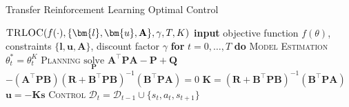 \begin{algorithm}[H]
\caption{Transfer Reinforcement Learning Optimal Control}\label{alg:trloc}
\begin{algorithmic}
\State 
\State ${\textsc{TRLOC}(f(\cdot), \{\bm{l}, \bm{u}, \mathbf{A}\}, \gamma, T, K)}$
\State \hspace{0.5cm}\textbf{input} objective function $f(\theta)$, constraints $\{\bm{l}, \bm{u}, \mathbf{A}\}$, discount factor $\gamma$
\State \hspace{0.5cm}\textbf{for} $t=0, \hdots, T$ \textbf{do}
\State \hspace{1.0cm}\textsc{Model Estimation}
\State \hspace{1.0cm}$\theta_t^{*} = \theta_t^K$
\State
\State \hspace{1.0cm}\textsc{Planning}
\State \hspace{1.0cm}$\underset{\mathbf{P}}{\textrm{solve}}$
\State \hspace{1.5cm}$\mathbf{A}^\top \mathbf{P}\mathbf{A}-\mathbf{P}+\mathbf{Q}$
\State \hspace{1.5cm}$-(\mathbf{A}^\top\mathbf{P}\mathbf{B})(\mathbf{R}+\mathbf{B}^\top\mathbf{P}\mathbf{B})^{-1}(\mathbf{B}^\top\mathbf{P}\mathbf{A})=0$
\State \hspace{1.0cm}$\mathbf{K} = (\mathbf{R} + \mathbf{B}^\top \mathbf{P} \mathbf{B})^{-1}(\mathbf{B}^\top\mathbf{P}\mathbf{A})$
\State \hspace{1.0cm}$\bm{u} = - \mathbf{K}\bm{s}$
\State
\State \hspace{1.0cm}\textsc{Control}
\State \hspace{1.0cm}$\mathcal{D}_t = \mathcal{D}_{t-1} \cup \{s_t, a_t, s_{t+1}\}$
\end{algorithmic}
\end{algorithm}

